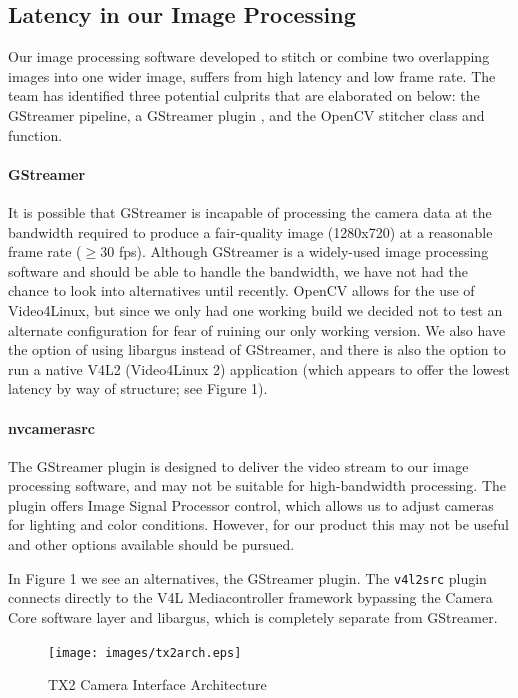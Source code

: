 \documentclass[letterpaper,10pt,serif,draftclsnofoot,onecolumn,compsoc,titlepage]{IEEEtran}
\begin{document}
\subsection{Latency in our Image Processing}
Our image processing software developed to stitch or combine two overlapping 
images into one wider image, suffers from high latency and low frame rate. The team has 
identified three potential culprits that are elaborated on below: the GStreamer pipeline, 
a GStreamer plugin , and the OpenCV stitcher class and function. 

\paragraph*{GStreamer} It is possible that GStreamer is incapable of processing the camera 
data at the bandwidth required to produce a fair-quality image (1280x720) at a reasonable 
frame rate ($\ge$30 fps). Although GStreamer is a widely-used image processing software 
and should be able to handle the bandwidth, we have not had the chance to look into 
alternatives until recently. OpenCV allows for the use of Video4Linux, but since we only 
had one working build we decided not to test an alternate configuration for fear of 
ruining our only working version. We also have the option of using libargus instead of 
GStreamer, and there is also the option to run a native V4L2 (Video4Linux 2) application 
(which appears to offer the lowest latency by way of structure; see Figure 1).

\paragraph*{nvcamerasrc} The GStreamer plugin  is designed to deliver 
the video stream to our image processing software, and may not be suitable for 
high-bandwidth processing. The  plugin offers Image Signal Processor 
control, which allows us to adjust cameras for lighting and color conditions. 
However, for our product this may not be useful and other options available should be 
pursued. 

In Figure 1 we see an alternatives, the  GStreamer plugin. The 
\texttt{v4l2src} plugin connects directly to the V4L Mediacontroller framework bypassing 
the Camera Core software layer and libargus, which is completely separate from GStreamer.

\begin{figure}[H]
  	\centering
	\label{fig:tx2arch}
	\texttt{[image: images/tx2arch.eps]}
	\caption{TX2 Camera Interface Architecture \label{overflow}}
\end{figure}
\end{document}
